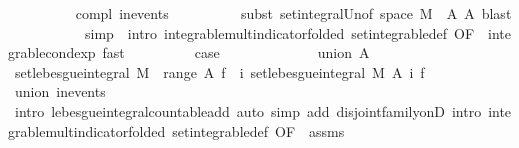 \begin{isabellebody}
\ \ \ \ \ \ \ \ \isamarkupfalse%
\ compl{\isacharparenleft}{\kern0pt}{}{\isacharparenright}{\kern0pt}\ in{\isacharunderscore}{\kern0pt}events\isanewline
\ \ \ \ \ \ \ \ \isamarkupfalse%
\ {\isacharparenleft}{\kern0pt}subst\ set{\isacharunderscore}{\kern0pt}integral{\isacharunderscore}{\kern0pt}Un{\isacharbrackleft}{\kern0pt}of\ {\isachardoublequoteopen}space\ M\ {\isacharminus}{\kern0pt}\ A{\isachardoublequoteclose}\ A{\isacharbrackright}{\kern0pt}{\isacharcomma}{\kern0pt}\ blast{\isacharparenright}{\kern0pt}\isanewline
\ \ \ \ \ \ \ \ \ \ \ {\isacharparenleft}{\kern0pt}simp\ {\isacharbar}{\kern0pt}\ intro\ integrable{\isacharunderscore}{\kern0pt}mult{\isacharunderscore}{\kern0pt}indicator{\isacharbrackleft}{\kern0pt}folded\ set{\isacharunderscore}{\kern0pt}integrable{\isacharunderscore}{\kern0pt}def{\isacharcomma}{\kern0pt}\ OF\ {\isacharunderscore}{\kern0pt}\ integrable{\isacharunderscore}{\kern0pt}cond{\isacharunderscore}{\kern0pt}exp{\isacharbrackright}{\kern0pt}{\isacharcomma}{\kern0pt}\ fast{\isacharparenright}{\kern0pt}{\isacharplus}{\kern0pt}\isanewline
\ \ \ \ \ \ \isamarkupfalse%
\ \isamarkupfalse%
\ {\isacharquery}{\kern0pt}case\ \isacommand{{\isachardot}{\kern0pt}}\isamarkupfalse%
\isanewline
\ \ \ \ \isamarkupfalse%
\isanewline
\ \ \ \ \ \ \isamarkupfalse%
\ {\isacharparenleft}{\kern0pt}union\ A{\isacharparenright}{\kern0pt}\isanewline
\ \ \ \ \ \ \isamarkupfalse%
\ {\isachardoublequoteopen}set{\isacharunderscore}{\kern0pt}lebesgue{\isacharunderscore}{\kern0pt}integral\ M\ {\isacharparenleft}{\kern0pt}{\isasymUnion}\ {\isacharparenleft}{\kern0pt}range\ A{\isacharparenright}{\kern0pt}{\isacharparenright}{\kern0pt}\ f\ {\isacharequal}{\kern0pt}\ {\isacharparenleft}{\kern0pt}{\isasymSum}i{\isachardot}{\kern0pt}\ set{\isacharunderscore}{\kern0pt}lebesgue{\isacharunderscore}{\kern0pt}integral\ M\ {\isacharparenleft}{\kern0pt}A\ i{\isacharparenright}{\kern0pt}\ f{\isacharparenright}{\kern0pt}{\isachardoublequoteclose}\ \isanewline
\ \ \ \ \ \ \ \ \isamarkupfalse%
\ union\ in{\isacharunderscore}{\kern0pt}events\isanewline
\ \ \ \ \ \ \ \ \isamarkupfalse%
\ {\isacharparenleft}{\kern0pt}intro\ lebesgue{\isacharunderscore}{\kern0pt}integral{\isacharunderscore}{\kern0pt}countable{\isacharunderscore}{\kern0pt}add{\isacharparenright}{\kern0pt}\ {\isacharparenleft}{\kern0pt}auto\ simp\ add{\isacharcolon}{\kern0pt}\ disjoint{\isacharunderscore}{\kern0pt}family{\isacharunderscore}{\kern0pt}onD\ intro{\isacharbang}{\kern0pt}{\isacharcolon}{\kern0pt}\ integrable{\isacharunderscore}{\kern0pt}mult{\isacharunderscore}{\kern0pt}indicator{\isacharbrackleft}{\kern0pt}folded\ set{\isacharunderscore}{\kern0pt}integrable{\isacharunderscore}{\kern0pt}def{\isacharcomma}{\kern0pt}\ OF\ {\isacharunderscore}{\kern0pt}\ assms{\isacharparenleft}{\kern0pt}{}{\isacharparenright}{\kern0pt}{\isacharbrackright}{\kern0pt}{\isacharparenright}{\kern0pt}\ \isanewline

\end{isabellebody}
